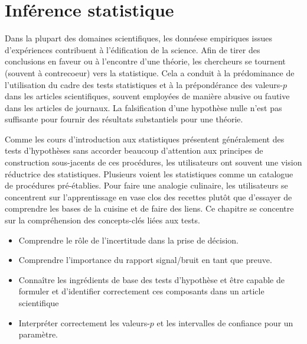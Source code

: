 \documentclass[
  11pt,
  letterpaper,
]{scrbook}
\providecommand{\tightlist}{%
  \setlength{\itemsep}{0pt}\setlength{\parskip}{0pt}}\usepackage{longtable,booktabs,array}
\theoremstyle{plain}
\theoremstyle{plain}
\theoremstyle{definition}
\theoremstyle{definition}
\theoremstyle{remark}
\begin{document}

\chapter{Inférence statistique}\label{inference}

Dans la plupart des domaines scientifiques, les donnéese empiriques
issues d'expériences contribuent à l'édification de la science. Afin de
tirer des conclusions en faveur ou à l'encontre d'une théorie, les
chercheurs se tournent (souvent à contrecoeur) vers la statistique. Cela
a conduit à la prédominance de l'utilisation du cadre des tests
statistiques et à la prépondérance des valeurs-\(p\) dans les articles
scientifiques, souvent employées de manière abusive ou fautive dans les
articles de journaux. La falsification d'une hypothèse nulle n'est pas
suffisante pour fournir des résultats substantiels pour une théorie.

Comme les cours d'introduction aux statistiques présentent généralement
des tests d'hypothèses sans accorder beaucoup d'attention aux principes
de construction sous-jacents de ces procédures, les utilisateurs ont
souvent une vision réductrice des statistiques. Plusieurs voient les
statistiques comme un catalogue de procédures pré-établies. Pour faire
une analogie culinaire, les utilisateurs se concentrent sur
l'apprentissage en vase clos des recettes plutôt que d'essayer de
comprendre les bases de la cuisine et de faire des liens. Ce chapitre se
concentre sur la compréhension des concepts-clés liées aux tests.

\begin{tcolorbox}[enhanced jigsaw, breakable, colbacktitle=quarto-callout-important-color!10!white, toprule=.15mm, leftrule=.75mm, colframe=quarto-callout-important-color-frame, bottomtitle=1mm, left=2mm, coltitle=black, toptitle=1mm, titlerule=0mm, title=\textcolor{quarto-callout-important-color}{\faExclamation}\hspace{0.5em}{Objectifs d'apprentissage}, arc=.35mm, opacitybacktitle=0.6, colback=white, rightrule=.15mm, bottomrule=.15mm, opacityback=0]

\begin{itemize}
\tightlist
\item
  Comprendre le rôle de l'incertitude dans la prise de décision.
\item
  Comprendre l'importance du rapport signal/bruit en tant que preuve.
\item
  Connaître les ingrédients de base des tests d'hypothèse et être
  capable de formuler et d'identifier correctement ces composants dans
  un article scientifique
\item
  Interpréter correctement les valeurs-\(p\) et les intervalles de
  confiance pour un paramètre.
\end{itemize}

\end{tcolorbox}
\end{document}
